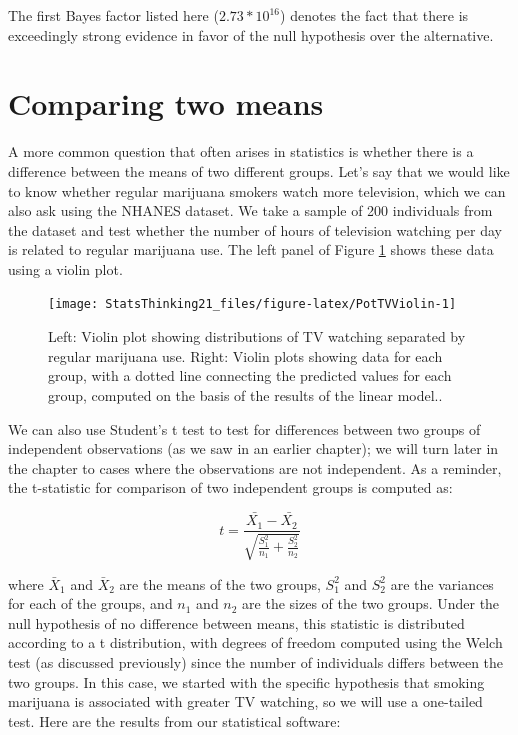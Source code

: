 \documentclass[
  12pt,
]{book}
\begin{document}
The first Bayes factor listed here (\(2.73 * 10^{16}\)) denotes the fact that there is exceedingly strong evidence in favor of the null hypothesis over the alternative.

\hypertarget{comparing-two-means}{%
\section{Comparing two means}\label{comparing-two-means}}

A more common question that often arises in statistics is whether there is a difference between the means of two different groups. Let's say that we would like to know whether regular marijuana smokers watch more television, which we can also ask using the NHANES dataset. We take a sample of 200 individuals from the dataset and test whether the number of hours of television watching per day is related to regular marijuana use. The left panel of Figure \ref{fig:PotTVViolin} shows these data using a violin plot.

\begin{figure}
\texttt{[image: StatsThinking21\_files/figure-latex/PotTVViolin-1]} \caption{Left: Violin plot showing distributions of TV watching separated by regular marijuana use. Right: Violin plots showing data for each group, with a dotted line connecting the predicted values for each group, computed on the basis of the results of the linear model.. }\label{fig:PotTVViolin}
\end{figure}

We can also use Student's t test to test for differences between two groups of independent observations (as we saw in an earlier chapter); we will turn later in the chapter to cases where the observations are not independent. As a reminder, the t-statistic for comparison of two independent groups is computed as:

\[
t = \frac{\bar{X_1} - \bar{X_2}}{\sqrt{\frac{S_1^2}{n_1} + \frac{S_2^2}{n_2}}}
\]

where \(\bar{X}_1\) and \(\bar{X}_2\) are the means of the two groups, \(S^2_1\) and \(S^2_2\) are the variances for each of the groups, and \(n_1\) and \(n_2\) are the sizes of the two groups. Under the null hypothesis of no difference between means, this statistic is distributed according to a t distribution, with degrees of freedom computed using the Welch test (as discussed previously) since the number of individuals differs between the two groups. In this case, we started with the specific hypothesis that smoking marijuana is associated with greater TV watching, so we will use a one-tailed test. Here are the results from our statistical software:
\end{document}

